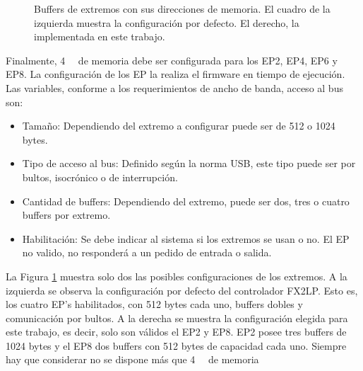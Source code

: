 \begin{figure}[t]
	\caption{Buffers de extremos con sus direcciones de memoria. El cuadro de la izquierda muestra la configuración por defecto. El derecho, la implementada en este trabajo.}
	\label{epbuf}
	\end{figure}
	
	Finalmente, \SI{4}{\kibi\byte} de memoria debe ser configurada para los EP2, EP4, EP6 y EP8. La configuración de los EP la realiza el firmware en tiempo de ejecución. Las variables, conforme a los requerimientos de ancho de banda, acceso al bus son:
	
	\begin{itemize}
		\item Tamaño: Dependiendo del extremo a configurar puede ser de 512 o 1024 bytes.
		\item Tipo de acceso al bus: Definido según la norma USB, este tipo puede ser por bultos, isocrónico o de interrupción.
		\item Cantidad de buffers: Dependiendo del extremo, puede ser dos, tres o cuatro buffers por extremo.
		\item Habilitación: Se debe indicar al sistema si los extremos se usan o no. El EP no valido, no responderá a un pedido de entrada o salida.
	\end{itemize}
	
	La Figura \ref{epbuf} muestra solo dos las posibles configuraciones de los extremos. A la izquierda se observa la configuración por defecto del controlador FX2LP. Esto es, los cuatro EP's habilitados, con 512 bytes cada uno, buffers dobles y comunicación por bultos. A la derecha se muestra la configuración elegida para este trabajo, es decir, solo son válidos el EP2 y EP8. EP2 posee tres buffers de 1024 bytes y el EP8 dos buffers con 512 bytes de capacidad cada uno. Siempre hay que considerar no se dispone más que \SI{4}{\kibi\byte} de memoria\\
	
